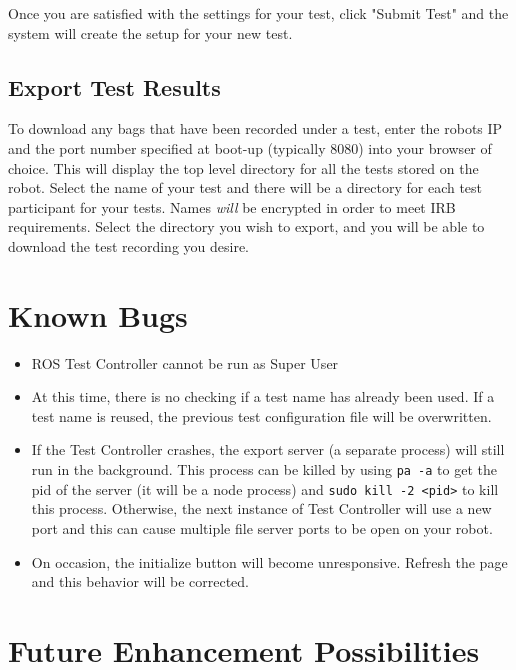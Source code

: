 \documentclass[onecolumn, draftclsnofoot,10pt, compsoc]{report}
\begin{document}
Once you are satisfied with the settings for your test, click "Submit Test" and the system will create the setup for your new test. 

\subsection{Export Test Results}
To download any bags that have been recorded under a test, enter the robots IP and the port number specified at boot-up (typically 8080) into your browser of choice. This will display the top level directory for all the tests stored on the robot. Select the name of your test and there will be a directory for each test participant for your tests. Names \textit{will} be encrypted in order to meet IRB requirements. Select the directory you wish to export, and you will be able to download the test recording you desire.

\section{Known Bugs}

\begin{itemize}
	\item ROS Test Controller cannot be run as Super User

	\item At this time, there is no checking if a test name has already been used. If a test name is reused, the previous test configuration file will be overwritten.

	\item If the Test Controller crashes, the export server (a separate process) will still run in the background. This process can be killed by using \texttt{pa -a} to get the pid of the server (it will be a node process) and \texttt{sudo kill -2 <pid>} to kill this process. Otherwise, the next instance of Test Controller will use a new port and this can cause multiple file server ports to be open on your robot.

	\item On occasion, the initialize button will become unresponsive. Refresh the page and this behavior will be corrected.
\end{itemize}

\section{Future Enhancement Possibilities}
\end{document}
